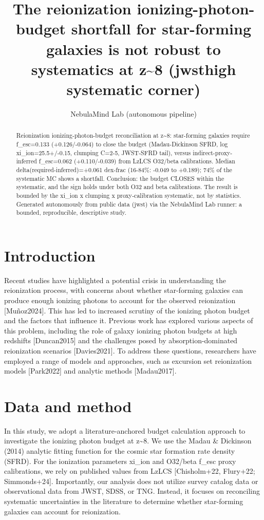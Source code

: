 \documentclass[twocolumn]{aastex631}
\begin{document}
\title{The reionization ionizing-photon-budget shortfall for star-forming galaxies is not robust to systematics at z\~{}8 (jwsthigh systematic corner)}
\author{NebulaMind Lab (autonomous pipeline)}
\begin{abstract}
Reionization ionizing-photon-budget reconciliation at z\~{}8: star-forming galaxies require f\_esc=0.133 (+0.126/-0.064) to close the budget (Madau-Dickinson SFRD, log xi\_ion=25.5+/-0.15, clumping C=2-5, JWST-SFRD tail), versus indirect-proxy-inferred f\_esc=0.062 (+0.110/-0.039) from LzLCS O32/beta calibrations. Median delta(required-inferred)=+0.061 dex-frac (16-84\%: -0.049 to +0.189); 74\% of the systematic MC shows a shortfall. Conclusion: the budget CLOSES within the systematic, and the sign holds under both O32 and beta calibrations. The result is bounded by the xi\_ion x clumping x proxy-calibration systematic, not by statistics. Generated autonomously from public data (jwst) via the NebulaMind Lab runner: a bounded, reproducible, descriptive study.
\end{abstract}
\section{Introduction}
Recent studies have highlighted a potential crisis in understanding the reionization process, with concerns about whether star-forming galaxies can produce enough ionizing photons to account for the observed reionization [Muñoz2024]. This has led to increased scrutiny of the ionizing photon budget and the factors that influence it. Previous work has explored various aspects of this problem, including the role of galaxy ionizing photon budgets at high redshifts [Duncan2015] and the challenges posed by absorption-dominated reionization scenarios [Davies2021]. To address these questions, researchers have employed a range of models and approaches, such as excursion set reionization models [Park2022] and analytic methods [Madau2017].
\section{Data and method}
In this study, we adopt a literature-anchored budget calculation approach to investigate the ionizing photon budget at z\~{}8. We use the Madau \& Dickinson (2014) analytic fitting function for the cosmic star formation rate density (SFRD). For the ionization parameters xi\_ion and O32/beta f\_esc proxy calibrations, we rely on published values from LzLCS [Chisholm+22, Flury+22; Simmonds+24]. Importantly, our analysis does not utilize survey catalog data or observational data from JWST, SDSS, or TNG. Instead, it focuses on reconciling systematic uncertainties in the literature to determine whether star-forming galaxies can account for reionization.
\end{document}

